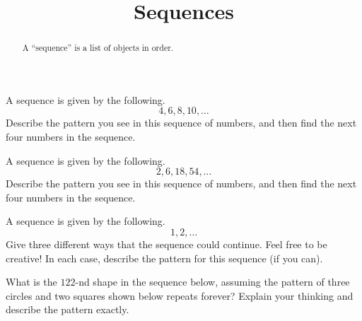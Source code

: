 \documentclass[noauthor,nooutcomes,handout]{ximera}
\title{Sequences}
\begin{document}
\begin{abstract} A ``sequence'' is a list of objects in order. \end{abstract}
\maketitle

\begin{problem}
A sequence is given by the following.
\[
4, 6, 8, 10, \dots
\]
Describe the pattern you see in this sequence of numbers, and then find the next four numbers in the sequence.
\end{problem} \vfill

\begin{problem}
A sequence is given by the following.
\[
2, 6, 18, 54, \dots
\]
Describe the pattern you see in this sequence of numbers, and then find the next four numbers in the sequence.
\end{problem} \vfill

\begin{problem}
A sequence is given by the following.
\[
1, 2, \dots
\]
Give three different ways that the sequence could continue. Feel free to be creative! In each case, describe the pattern for this sequence (if you can).
\end{problem} \vfill


\begin{problem}
What is the $122$-nd shape in the sequence below, assuming the pattern of three circles and two squares shown below repeats forever? Explain your thinking and describe the pattern exactly.
\begin{center}
\end{center}
\end{problem} \vfill


\newpage
\end{document}
